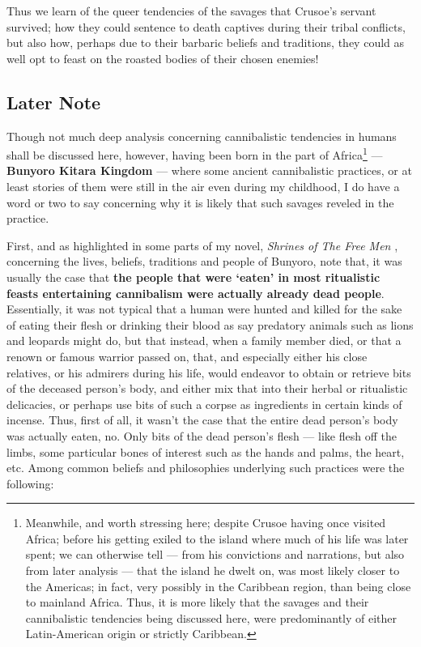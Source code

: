 \documentclass[a4paper]{article}
\begin{document}
Thus we learn of the queer tendencies of the savages that Crusoe's servant survived; how they could sentence to death captives during their tribal conflicts, but also how, perhaps due to their barbaric beliefs and traditions, they could as well opt to feast on the roasted bodies of their chosen enemies!

\subsection{Later Note}


Though not much deep analysis concerning cannibalistic tendencies in humans shall be discussed here, however, having been born in the part of Africa\footnote{Meanwhile, and worth stressing here; despite Crusoe having once visited Africa; before his getting exiled to the island where much of his life was later spent; we can otherwise tell --- from his convictions and narrations, but also from later analysis --- that the island he dwelt on, was most likely closer to the Americas; in fact, very possibly in the Caribbean region, than being close to mainland Africa. Thus, it is more likely that the savages and their cannibalistic tendencies being discussed here, were predominantly of either Latin-American origin or strictly Caribbean.} --- \textbf{Bunyoro Kitara Kingdom} --- where some ancient cannibalistic practices, or at least stories of them were still in the air even during my childhood, I do have a word or two to say concerning why it is likely that such savages reveled in the practice.

First, and as highlighted in some parts of my novel, \textit{Shrines of The Free Men} \cite{shrinesjwl}, concerning the lives, beliefs, traditions and people of Bunyoro, note that, it was usually the case that \textbf{the people that were `eaten' in most ritualistic feasts entertaining cannibalism were actually already dead people}. Essentially, it was not typical that a human were hunted and killed for the sake of eating their flesh or drinking their blood as say predatory animals such as lions and leopards might do, but that instead, when a family member died, or that a renown or famous warrior passed on, that, and especially either his close relatives, or his admirers during his life, would endeavor to obtain or retrieve bits of the deceased person's body, and either mix that into their herbal or ritualistic delicacies, or perhaps use bits of such a corpse as ingredients in certain kinds of incense. Thus, first of all, it wasn't the case that the entire dead person's body was actually eaten, no. Only bits of the dead person's flesh --- like flesh off the limbs, some particular bones of interest such as the hands and palms, the heart, etc. Among common beliefs and philosophies underlying such practices were the following:
\end{document}
